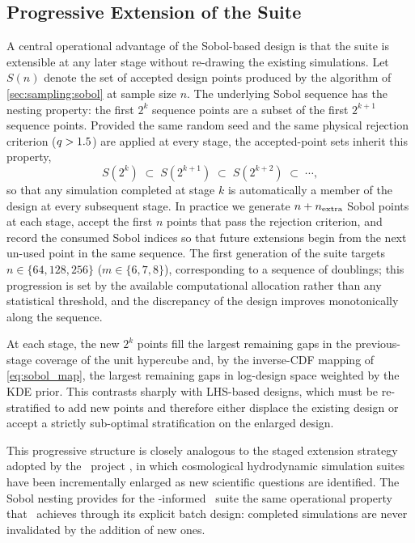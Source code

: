 \subsection{Progressive Extension of the Suite}
\label{sec:sampling:progressive}

A central operational advantage of the Sobol-based design is that the
suite is extensible at any later stage without re-drawing the existing
simulations. Let $S(n)$ denote the set of accepted design points produced by the
algorithm of \autoref{sec:sampling:sobol} at sample size $n$.
The underlying Sobol sequence has the nesting property: the first
$2^{k}$ sequence points are a subset of the first $2^{k+1}$ sequence
points. Provided the same random seed and the same physical rejection
criterion ($q > 1.5$) are applied at every stage, the
accepted-point sets inherit this property,
\begin{equation}
S(2^{k}) \;\subset\; S(2^{k+1}) \;\subset\; S(2^{k+2}) \;\subset\; \cdots,
\label{eq:sobol_nesting}
\end{equation}
so that any simulation completed at stage $k$ is automatically a member
of the design at every subsequent stage. In practice we generate
$n + n_{\rm extra}$ Sobol points at each stage, accept the first $n$
points that pass the rejection criterion, and record the consumed Sobol
indices so that future extensions begin from the next un-used point in
the same sequence. The first generation of the
suite targets $n \in \{64, 128, 256\}$ ($m \in \{6, 7, 8\}$),
corresponding to a sequence of doublings; this progression is set by the
available computational allocation rather than any statistical
threshold, and the discrepancy of the design improves monotonically
along the sequence.

At each stage, the new $2^{k}$ points fill the largest remaining gaps in
the previous-stage coverage of the unit hypercube and, by the inverse-CDF
mapping of \autoref{eq:sobol_map}, the largest remaining gaps in
log-design space weighted by the KDE prior. This contrasts sharply with
LHS-based designs, which must be re-stratified to add new points and
therefore either displace the existing design or accept a strictly
sub-optimal stratification on the enlarged design.

This progressive structure is closely analogous to the staged extension
strategy adopted by the \CAMELS\ project
\citep{2021ApJ...915...71V}, in which cosmological hydrodynamic
simulation suites have been incrementally enlarged as new scientific
questions are identified. The Sobol nesting provides for the
\PHANGS-informed \TIGRESS\ suite the same operational property that
\CAMELS\ achieves through its explicit batch design: completed
simulations are never invalidated by the addition of new ones.


